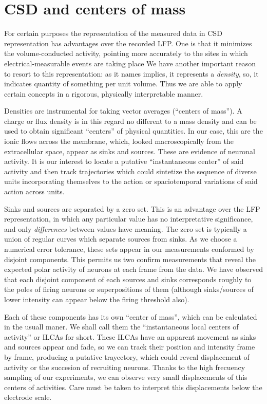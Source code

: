 \documentclass{article}
\begin{document}
\section{CSD and centers of mass}


For certain purposes the representation of the measured data in CSD
representation has advantages over the recorded LFP. One is
that it minimizes the volume-conducted activity, pointing more accurately
to the sites in which electrical-measurable events are taking place %
We have another important reason to resort to this representation:
as it names implies, it represents a \emph{density}, so, it indicates
quantity of something per unit volume. Thus we are able to apply certain
concepts in a rigorous, physically interpretable manner.

Densities are instrumental for taking vector averages (``centers
of mass''). A charge or flux density is in this regard no different to a
mass density and can be used to obtain significant ``centers'' of
physical quantities. In our case, this are the ionic flows across
the membrane, which, looked macroscopically from the extracellular
space, appear as sinks and sources. These are evidence of neuronal
activity. It is our interest to locate a
putative ``instantaneous center'' of said activity and then track
trajectories which could sintetize the sequence of diverse units
incorporating themselves to the action or spaciotemporal variations of
said action across units.

Sinks and sources are separated by a zero set. This is an advantage
over the LFP representation, in which any particular value has no
interpretative significance, and only \emph{differences} between values
have meaning. 
The zero  set is typically a union of regular 
curves which separate sources from sinks. As we choose a numerical error
tolerance, these sets appear in our measurements conformed by disjoint
components. This permits us two confirm measurements that reveal
the expected polar activity of neurons
at each frame from the data. We have observed that each disjoint component
of each sources and sinks corresponds roughly to the poles of firing neurons
or superpositions of them (although sinks/sources of lower intensity
can appear below the firing threshold also).

Each of these components has its own  ``center of mass'', which can be
calculated in the usuall maner. We shall call them the ``instantaneous local
centers of activity'' or ILCAs for short. These ILCAs have an apparent
movement as sinks and sources appear and fade, so we can track their
position and intensity frame by frame, producing a putative trayectory,
which could reveal displacement of activity or the succesion of recruiting
neurons. 
Thanks to the high frecuency sampling of our experiments, we can observe
very small displacements of this centers of activities. Care must be taken
to interpret this displacements below the electrode scale.
\end{document}

